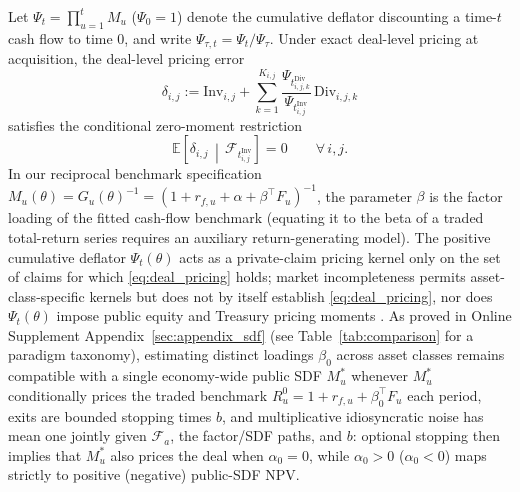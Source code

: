 \documentclass[12pt]{article}
\begin{document}
Let $\Psi_t = \prod_{u=1}^t M_u$ ($\Psi_0 = 1$) denote the cumulative deflator discounting a time-$t$ cash flow to time $0$, and write $\Psi_{\tau,t} = \Psi_t / \Psi_\tau$.
Under exact deal-level pricing at acquisition, the deal-level pricing error
\begin{equation}
\label{eq:deal_pricing_error}
\delta_{i,j} := \mathrm{Inv}_{i,j} + \sum_{k=1}^{K_{i,j}} \frac{\Psi_{t_{i,j,k}^{\mathrm{Div}}}}{\Psi_{t_{i,j}^{\mathrm{Inv}}}}\,\mathrm{Div}_{i,j,k}
\end{equation}
satisfies the conditional zero-moment restriction
\begin{equation}
\label{eq:deal_pricing}
\mathbb{E}\!\left[\delta_{i,j} \,\middle|\, \mathcal{F}_{t_{i,j}^{\mathrm{Inv}}}\right] = 0 \qquad \forall\, i,j.
\end{equation}
In our reciprocal benchmark specification $M_u(\theta) = G_u(\theta)^{-1} = (1 + r_{f,u} + \alpha + \beta^\top F_u)^{-1}$, the parameter $\beta$ is the factor loading of the fitted cash-flow benchmark (equating it to the beta of a traded total-return series requires an auxiliary return-generating model).
The positive cumulative deflator $\Psi_t(\theta)$ acts as a private-claim pricing kernel only on the set of claims for which \eqref{eq:deal_pricing} holds; market incompleteness \citep{HR87} permits asset-class-specific kernels but does not by itself establish \eqref{eq:deal_pricing}, nor does $\Psi_t(\theta)$ impose public equity and Treasury pricing moments \citep{KN16,GSW20,GN18,KN24}.
As proved in Online Supplement Appendix~\ref{sec:appendix_sdf} (see Table~\ref{tab:comparison} for a paradigm taxonomy), estimating distinct loadings $\beta_0$ across asset classes remains compatible with a single economy-wide public SDF $M_u^\ast$ whenever $M_u^\ast$ conditionally prices the traded benchmark $R_u^0 = 1 + r_{f,u} + \beta_0^\top F_u$ each period, exits are bounded stopping times $b$, and multiplicative idiosyncratic noise has mean one jointly given $\mathcal{F}_a$, the factor/SDF paths, and $b$: optional stopping then implies that $M_u^\ast$ also prices the deal when $\alpha_0 = 0$, while $\alpha_0 > 0$ ($\alpha_0 < 0$) maps strictly to positive (negative) public-SDF NPV.
\end{document}
